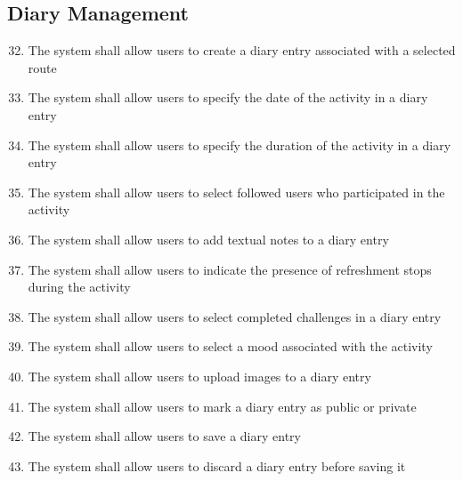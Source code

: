 \subsection{Diary Management}

\begin{enumerate}[label=\textbf{FR\arabic*}, ref=FR\arabic*]

\setcounter{enumi}{31}


\item \label{fr-smartphone:create-diary}
The system shall allow users to create a diary entry associated with a selected route

\item \label{fr-smartphone:diary-date}
The system shall allow users to specify the date of the activity in a diary entry

\item \label{fr-smartphone:diary-duration}
The system shall allow users to specify the duration of the activity in a diary entry

\item \label{fr-smartphone:select-participants}
The system shall allow users to select followed users who participated in the activity

\item \label{fr-smartphone:diary-notes}
The system shall allow users to add textual notes to a diary entry

\item \label{fr-smartphone:refreshment-stops}
The system shall allow users to indicate the presence of refreshment stops during the activity

\item \label{fr-smartphone:completed-challenges}
The system shall allow users to select completed challenges in a diary entry

\item \label{fr-smartphone:diary-mood}
The system shall allow users to select a mood associated with the activity

\item \label{fr-smartphone:upload-images}
The system shall allow users to upload images to a diary entry

\item \label{fr-smartphone:diary-visibility}
The system shall allow users to mark a diary entry as public or private

\item \label{fr-smartphone:save-diary}
The system shall allow users to save a diary entry

\item \label{fr-smartphone:discard-diary}
The system shall allow users to discard a diary entry before saving it

\end{enumerate}

